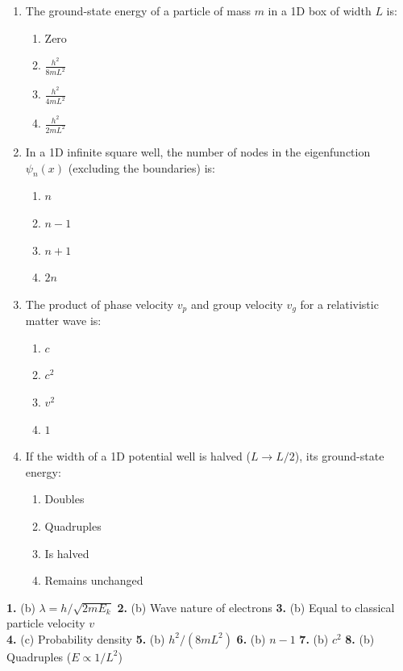 \begin{enumerate}
    \item The ground-state energy of a particle of mass $m$ in a 1D box of width $L$ is:
    \begin{enumerate}
        \item Zero
        \item $\frac{h^2}{8mL^2}$
        \item $\frac{h^2}{4mL^2}$
        \item $\frac{h^2}{2mL^2}$
    \end{enumerate}
    
    \item In a 1D infinite square well, the number of nodes in the eigenfunction $\psi_n(x)$ (excluding the boundaries) is:
    \begin{enumerate}
        \item $n$
        \item $n-1$
        \item $n+1$
        \item $2n$
    \end{enumerate}
    
    \item The product of phase velocity $v_p$ and group velocity $v_g$ for a relativistic matter wave is:
    \begin{enumerate}
        \item $c$
        \item $c^2$
        \item $v^2$
        \item $1$
    \end{enumerate}
    
    \item If the width of a 1D potential well is halved ($L \to L/2$), its ground-state energy:
    \begin{enumerate}
        \item Doubles
        \item Quadruples
        \item Is halved
        \item Remains unchanged
    \end{enumerate}
\end{enumerate}

\begin{solutionbox}
\textbf{1.} (b) $\lambda = h/\sqrt{2m E_k}$ \quad \textbar\quad
\textbf{2.} (b) Wave nature of electrons \quad \textbar\quad
\textbf{3.} (b) Equal to classical particle velocity $v$ \\
\textbf{4.} (c) Probability density \quad \textbar\quad
\textbf{5.} (b) $h^2 / (8mL^2)$ \quad \textbar\quad
\textbf{6.} (b) $n-1$ \quad \textbar\quad
\textbf{7.} (b) $c^2$ \quad \textbar\quad
\textbf{8.} (b) Quadruples ($E \propto 1/L^2$)
\end{solutionbox}

